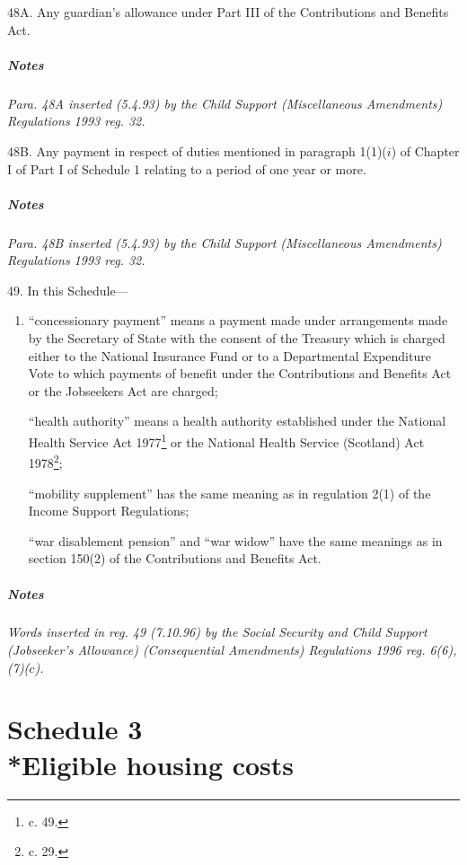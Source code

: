 \documentclass[a4paper]{article}
\newcommand\amendment[1]{\subsubsection*{Notes}{\itshape\frenchspacing\footnotesize #1 \par\goodbreak}}
\begin{document}
\medskip


48A.  Any guardian’s allowance under Part III of the Contributions and Benefits Act. 

\amendment{
Para. 48A inserted (5.4.93) by the Child Support (Miscellaneous Amendments) Regulations 1993 reg. 32.
}

\medskip

48B. Any payment in respect of duties mentioned in paragraph 1(1)($i$) of Chapter I of Part I of Schedule 1 relating to a period of one year or more.

\amendment{
Para. 48B inserted (5.4.93) by the Child Support (Miscellaneous Amendments) Regulations 1993 reg. 32.
}

\medskip

49.  In this Schedule—
\begin{enumerate}\item[]
“concessionary payment” means a payment made under arrangements made by the Secretary of State with the consent of the Treasury which is charged either to the National Insurance Fund or to a Departmental Expenditure Vote to which payments of benefit under the Contributions and Benefits Act 
or the Jobseekers Act  %
are charged;

“health authority” means a health authority established under the National Health Service Act 1977\footnote{ c. 49.} or the National Health Service (Scotland) Act 1978\footnote{ c. 29.};

“mobility supplement” has the same meaning as in regulation 2(1) of the Income Support Regulations;

“war disablement pension” and “war widow” have the same meanings as in section 150(2) of the Contributions and Benefits Act.
\end{enumerate}

\amendment{
Words inserted in reg. 49 (7.10.96) by the Social Security and Child Support (Jobseeker's Allowance) (Consequential Amendments) Regulations 1996 reg. 6(6), (7)($c$).
}

\part[Schedule 3 --- Eligible housing costs]{Schedule 3\\*Eligible housing costs}
\end{document}
